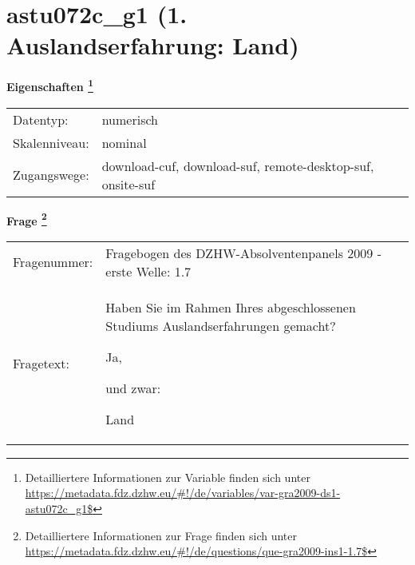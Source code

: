 
    \setcounter{footnote}{0}

    \vspace*{-1.8cm}
	\section{astu072c\_g1 (1. Auslandserfahrung: Land)}
	\label{section:astu072c_g1}



    \vspace*{0.5cm}
    \noindent\textbf{Eigenschaften
	\footnote{Detailliertere Informationen zur Variable finden sich unter
		\url{https://metadata.fdz.dzhw.eu/\#!/de/variables/var-gra2009-ds1-astu072c_g1$}}}\\
	\begin{tabularx}{\hsize}{@{}lX}
	Datentyp: & numerisch \\
	Skalenniveau: & nominal \\
	Zugangswege: &
	  download-cuf, 
	  download-suf, 
	  remote-desktop-suf, 
	  onsite-suf
 \\
    \end{tabularx}



				\vspace*{0.5cm}
                \noindent\textbf{Frage
	                \footnote{Detailliertere Informationen zur Frage finden sich unter
		              \url{https://metadata.fdz.dzhw.eu/\#!/de/questions/que-gra2009-ins1-1.7$}}}\\
				\begin{tabularx}{\hsize}{@{}lX}
					Fragenummer: &
					  Fragebogen des DZHW-Absolventenpanels 2009 - erste Welle:
					  1.7
 \\
					Fragetext: & Haben Sie im Rahmen Ihres abgeschlossenen Studiums Auslandserfahrungen gemacht?\par  Ja,\par  und zwar:\par  Land \\
				\end{tabularx}





